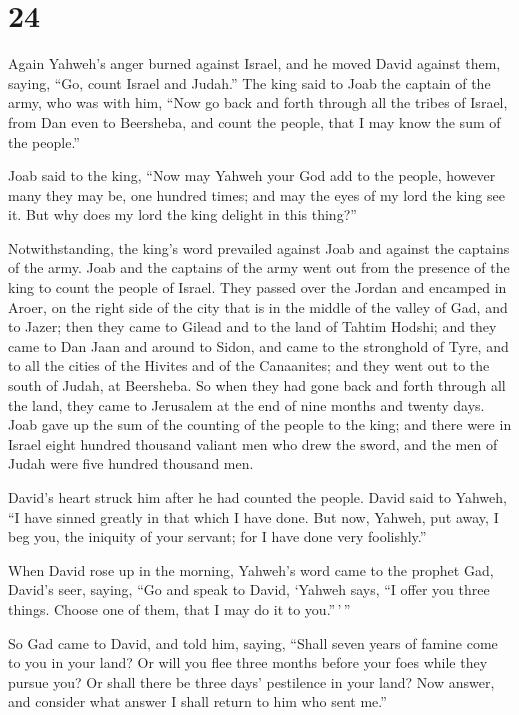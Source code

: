 \hypertarget{section-23}{%
\section{24}\label{section-23}}

 Again Yahweh's anger burned against Israel, and he moved
David against them, saying, ``Go, count Israel and Judah.''
 The king said to Joab the captain of the army, who was
with him, ``Now go back and forth through all the tribes of Israel, from
Dan even to Beersheba, and count the people, that I may know the sum of
the people.''

 Joab said to the king, ``Now may Yahweh your God add to
the people, however many they may be, one hundred times; and may the
eyes of my lord the king see it. But why does my lord the king delight
in this thing?''

 Notwithstanding, the king's word prevailed against Joab
and against the captains of the army. Joab and the captains of the army
went out from the presence of the king to count the people of Israel.
 They passed over the Jordan and encamped in Aroer, on the
right side of the city that is in the middle of the valley of Gad, and
to Jazer;  then they came to Gilead and to the land of
Tahtim Hodshi; and they came to Dan Jaan and around to Sidon,
 and came to the stronghold of Tyre, and to all the cities
of the Hivites and of the Canaanites; and they went out to the south of
Judah, at Beersheba.  So when they had gone back and forth
through all the land, they came to Jerusalem at the end of nine months
and twenty days.  Joab gave up the sum of the counting of
the people to the king; and there were in Israel eight hundred thousand
valiant men who drew the sword, and the men of Judah were five hundred
thousand men.

 David's heart struck him after he had counted the
people. David said to Yahweh, ``I have sinned greatly in that which I
have done. But now, Yahweh, put away, I beg you, the iniquity of your
servant; for I have done very foolishly.''

 When David rose up in the morning, Yahweh's word came to
the prophet Gad, David's seer, saying,  ``Go and speak to
David, `Yahweh says, ``I offer you three things. Choose one of them,
that I may do it to you.''\,'\,''

 So Gad came to David, and told him, saying, ``Shall
seven years of famine come to you in your land? Or will you flee three
months before your foes while they pursue you? Or shall there be three
days' pestilence in your land? Now answer, and consider what answer I
shall return to him who sent me.''

